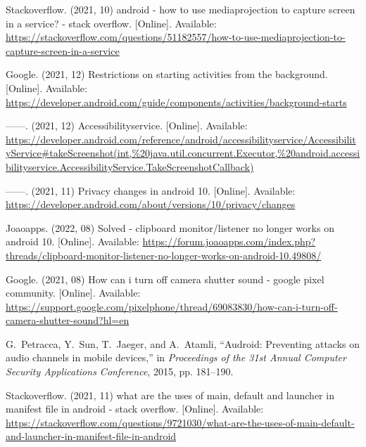 \documentclass[sigconf,balance=false]{acmart}
\begin{document}
\begin{thebibliography}{100}
\BIBentryALTinterwordspacing
Stackoverflow. (2021, 10) android - how to use mediaprojection to capture
  screen in a service? - stack overflow. [Online]. Available:
  \url{https://stackoverflow.com/questions/51182557/how-to-use-mediaprojection-to-capture-screen-in-a-service}
\BIBentrySTDinterwordspacing

\BIBentryALTinterwordspacing
Google. (2021, 12) Restrictions on starting activities from the background.
  [Online]. Available:
  \url{https://developer.android.com/guide/components/activities/background-starts}
\BIBentrySTDinterwordspacing

\BIBentryALTinterwordspacing
------. (2021, 12) Accessibilityservice. [Online]. Available:
  \url{https://developer.android.com/reference/android/accessibilityservice/AccessibilityService#takeScreenshot(int,%20java.util.concurrent.Executor,%20android.accessibilityservice.AccessibilityService.TakeScreenshotCallback)}
\BIBentrySTDinterwordspacing

\BIBentryALTinterwordspacing
------. (2021, 11) Privacy changes in android 10. [Online]. Available:
  \url{https://developer.android.com/about/versions/10/privacy/changes}
\BIBentrySTDinterwordspacing

\BIBentryALTinterwordspacing
Joaoapps. (2022, 08) Solved - clipboard monitor/listener no longer works on
  android 10. [Online]. Available:
  \url{https://forum.joaoapps.com/index.php?threads/clipboard-monitor-listener-no-longer-works-on-android-10.49808/}
\BIBentrySTDinterwordspacing

\BIBentryALTinterwordspacing
Google. (2021, 08) How can i turn off camera shutter sound - google pixel
  community. [Online]. Available:
  \url{https://support.google.com/pixelphone/thread/69083830/how-can-i-turn-off-camera-shutter-sound?hl=en}
\BIBentrySTDinterwordspacing

G.~Petracca, Y.~Sun, T.~Jaeger, and A.~Atamli, ``Audroid: Preventing attacks on
  audio channels in mobile devices,'' in \emph{Proceedings of the 31st Annual
  Computer Security Applications Conference}, 2015, pp. 181--190.

\BIBentryALTinterwordspacing
Stackoverflow. (2021, 11) what are the uses of main, default and launcher in
  manifest file in android - stack overflow. [Online]. Available:
  \url{https://stackoverflow.com/questions/9721030/what-are-the-uses-of-main-default-and-launcher-in-manifest-file-in-android}
\BIBentrySTDinterwordspacing


\end{thebibliography}
\end{document}
